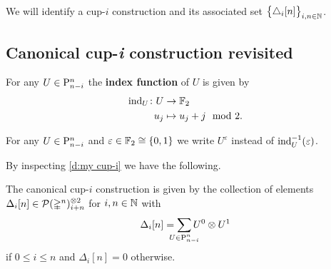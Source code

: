 We will identify a \mbox{cup-$i$} construction and its associated set $\big\{ \triangle_i [n] \big\}_{i,n \in \mathbb{N}}$.

\subsection{Canonical cup-\textit{i} construction revisited}

\begin{definition}
	For any $U \in \mathrm{P}^n_{n-i}$ the \textbf{index function} of $U$ is given by
	\[
	\begin{split}
	\operatorname{ind}_U \colon U &\to {\mathbb{F}_2} \\
	u_j &\mapsto u_j + j \mod 2.
	\end{split}
	\]
\end{definition}

\begin{notation*}
	For any $U \in \mathrm{P}^n_{n-i}$ and $\varepsilon \in {\mathbb{F}_2} \cong \{0,1\}$ we write $U^\varepsilon$ instead of $\operatorname{ind}_U^{-1}(\varepsilon)$.
\end{notation*}

By inspecting \cref{d:my cup-i} we have the following.

\begin{lemma}\label{l:canonical}
	The canonical \mbox{cup-$i$} construction is given by the collection of elements $\Delta_i[n] \in \mathcal{P}(\mathbb{\Delta}^n)^{\otimes 2}_{i+n}$ for $i,n \in \mathbb{N}$ with
	\[
	\Delta_i[n] =
	\sum_{\mathclap{U \in \rP^n_{n-i}}} U^0 \ot U^1
	\]
	if $0 \leq i \leq n$ and $\Delta_i[n] = 0$ otherwise.
\end{lemma}